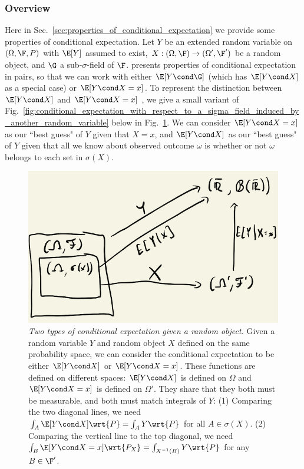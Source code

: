 \documentclass{article} %
\begin{document}
\subsubsection{Overview}


Here in Sec.~\ref{sec:properties_of_conditional_expectation} we provide some properties of conditional expectation.  Let $Y$ be an extended random variable on $(\Omega, \F, P)$  with $\E[Y]$ assumed to exist, $X : (\Omega, \F) \to  (\Omega', \F')$ be a random object, and $\G$ a sub-$\sigma$-field of $\F$.   \citet{ash2000probability} presents properties of conditional expectation in pairs, so that we can work with either $\E[Y \cond \G]$ (which has $\E[Y \cond X]$ as a special case)   or $\E[Y \cond X = x]$.  To represent the distinction between $\E[Y \cond X]$ and $\E[Y \cond X = x]$ , we give a small variant of Fig.~\ref{fig:conditional_expectation_with_respect_to_a_sigma_field_induced_by_another_random_variable} below in Fig.~\ref{fig:two_types_of_conditional_expectation_given_another_random_variable}.  We can consider $\E[Y \cond X=x]$ as our ``best guess" of $Y$ given that $X=x$, and $\E[Y \cond X]$ as our ``best guess" of $Y$ given that all we know about observed outcome $\omega$ is whether or not $\omega$ belongs to each set in $\sigma(X)$.



\begin{figure}[H]
\centering
\includegraphics[width=.6\linewidth]{images/two_types_of_conditional_expectation_given_a_random_object}
\caption{\textit{Two types of conditional expectation given a random object.}   Given a random variable $Y$ and random object $X$ defined on the same probability space, we can consider the conditional expectation to be either  $\E[Y \cond X]$ or $\E[Y \cond X=x]$.   These functions are defined on different spaces: $\E[Y \cond X]$ is defined on $\Omega$ and $\E[Y \cond X=x]$ is defined on $\Omega'$.  They share that they both must be measurable, and both must match integrals of $Y$: (1)  Comparing the two diagonal lines, we need $\int_A \E[Y \cond X] \wrt{P} = \int_A Y \wrt{P}$  for all $A \in \sigma(X)$. (2) Comparing the vertical line to the top diagonal, we need $\int_B \E[Y \cond X=x] \wrt{P_X} = \int_{X^{-1}(B)} Y \wrt{P}$ for any $B \in \F'$. }
\label{fig:two_types_of_conditional_expectation_given_another_random_variable}	
\end{figure}
\end{document}
